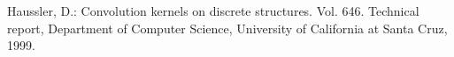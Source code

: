 \documentclass[runningheads,a4paper]{llncs}
\begin{document}
\begin{thebibliography}{4}
 Haussler, D.: Convolution kernels on discrete structures. Vol. 646. Technical report, Department of Computer Science, University of California at Santa Cruz, 1999.

%
%
%
%
%

\end{thebibliography}
\end{document}
